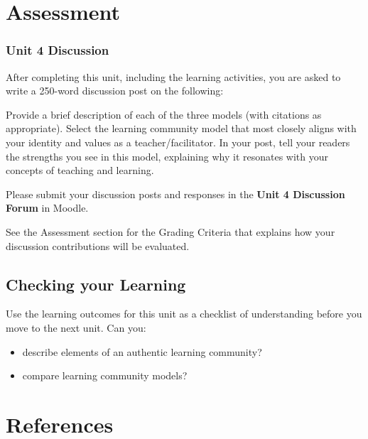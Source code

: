 \documentclass[
]{book}
\providecommand{\tightlist}{%
  \setlength{\itemsep}{0pt}\setlength{\parskip}{0pt}}
\begin{document}
\hypertarget{assessment-3}{%
\section*{Assessment}\label{assessment-3}}

\begin{assessment}
\hypertarget{unit-4-discussion}{%
\subsubsection{Unit 4 Discussion}\label{unit-4-discussion}}

After completing this unit, including the learning activities, you are
asked to write a 250-word discussion post on the following:

Provide a brief description of each of the three models (with citations
as appropriate). Select the learning community model that most closely
aligns with your identity and values as a teacher/facilitator. In your
post, tell your readers the strengths you see in this model, explaining
why it resonates with your concepts of teaching and learning.

Please submit your discussion posts and responses in the \textbf{Unit 4
Discussion Forum} in Moodle.

See the Assessment section for the Grading Criteria that explains how
your discussion contributions will be evaluated.
\end{assessment}

\hypertarget{checking-your-learning-3}{%
\subsection*{Checking your Learning}\label{checking-your-learning-3}}

\begin{progress}
Use the learning outcomes for this unit as a checklist of understanding
before you move to the next unit. Can you:

\begin{itemize}
\tightlist
\item
  describe elements of an authentic learning community?
\item
  compare learning community models?
\end{itemize}
\end{progress}

\hypertarget{references-1}{%
\section*{References}\label{references-1}}
\end{document}
